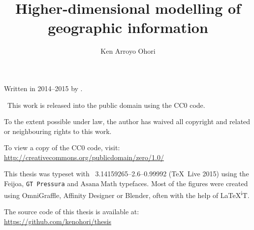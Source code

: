 
\author{Ken Arroyo Ohori}
\title{Higher-dimensional modelling of geographic information}
\date{}
\maketitle

\clearpage
\thispagestyle{empty}
\null%
\label{thesis:colophon}
\vfill
{}
Written in 2014--2015 by
{\makeatletter
\href{http://ken.mx}{\@author}%
\makeatother}.

\cczero\ This work is released into the public domain using the CC0 code.

To the extent possible under law, the author has waived all copyright and related or neighbouring rights to this work.

To view a copy of the CC0 code, visit: \\
\url{http://creativecommons.org/publicdomain/zero/1.0/}

This thesis was typeset with \XeTeX\ 3.14159265--2.6--0.99992 (\TeX\ Live 2015) using the \mbox{{\fanciestfont{}Feijoa}}, \texttt{GT Pressura} and $\mathrm{Asana\ Math}$ typefaces.
Most of the figures were created using OmniGraffle, Affinity Designer or Blender, often with the help of \LaTeX{}\textsuperscript{i}T.

The source code of this thesis is available at: \\
\url{https://github.com/kenohori/thesis}

